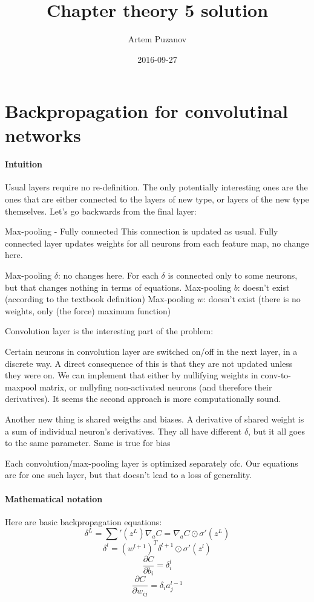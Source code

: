 \documentclass{article}
\title{Chapter theory 5 solution}
\date{2016-09-27}
\author{Artem Puzanov}
\begin{document}
\maketitle
{}
\newpage
{}


\section{Backpropagation for convolutinal networks}
\paragraph{Intuition}
Usual layers require no re-definition.
The only potentially interesting ones are the ones that are either connected to the layers of new type,
or layers of the new type themselves.
Let's go backwards from the final layer:

Max-pooling - Fully connected
This connection is updated as usual. Fully connected layer updates weights for all neurons from each feature map, no change here.

Max-pooling $\delta$: no changes here. For each $\delta$ is connected only to some neurons, but that changes nothing in terms of equations.
Max-pooling $b$: doesn't exist (according to the textbook definition)
Max-pooling $w$: doesn't exist (there is no weights, only (the force) maximum function)

Convolution layer is the interesting part of the problem:

Certain neurons in convolution layer are switched on/off in the next layer, in a discrete way. 
A direct consequence of this is that they are not updated unless they were on.
We can implement that either by nullifying weights in conv-to-maxpool matrix, or nullyfing non-activated neurons (and therefore their derivatives). It seems the second approach is more computationally sound.

Another new thing is shared weigths and biases. 
A derivative of shared weight is a sum of individual neuron's derivatives.
They all have different $\delta$, but it all goes to the same parameter.
Same is true for bias

Each convolution/max-pooling layer is optimized separately ofc. 
Our equations are for one such layer, but that doesn't lead to a loss of generality.


\paragraph{Mathematical notation}
Here are basic backpropagation equations:
$$\delta^L = {\sum}'(z^L)\nabla_aC = \nabla_aC\odot\sigma'(z^L)$$
$$\delta^l = (w^{l+1})^{T} \delta^{l+1}\odot\sigma'(z^l)$$
$$\frac{\partial C}{\partial b_i} = \delta^l_i$$
$$\frac{\partial C}{\partial w_{ij}} = \delta_i a^{l-1}_{j}$$
\end{document}
